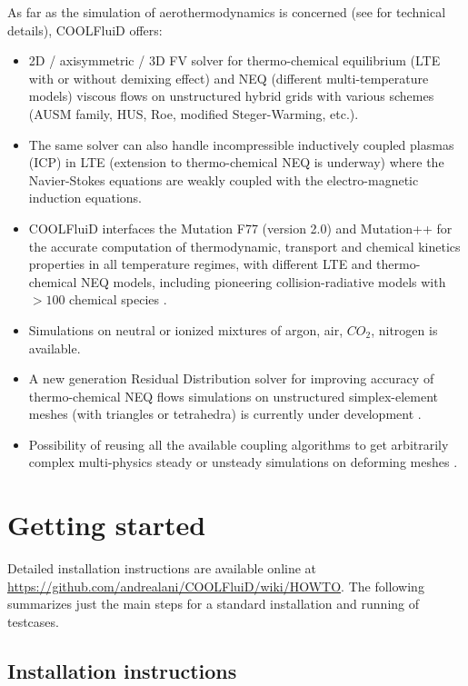 \documentclass[11pt]{article}
\begin{document}
As far as the simulation of aerothermodynamics is concerned 
(see \cite{phd:lani, phd:panesi} for technical details), COOLFluiD offers: 
\begin{itemize}
\item 
  2D / axisymmetric / 3D FV solver for thermo-chemical equilibrium 
  (LTE with or without demixing effect) and NEQ 
  (different multi-temperature models) viscous flows 
  on unstructured hybrid grids with various schemes 
  (AUSM family, HUS, Roe, modified Steger-Warming, etc.).
\item 
  The same solver can also handle incompressible inductively coupled plasmas (ICP) in LTE 
  (extension to thermo-chemical NEQ is underway) where the Navier-Stokes equations 
  are weakly coupled with the electro-magnetic induction equations. 
\item
  COOLFluiD interfaces the Mutation F77 (version 2.0) and Mutation++ for the 
  accurate computation of thermodynamic, transport and chemical kinetics properties 
  in all temperature regimes, with different LTE and thermo-chemical NEQ models, 
  including pioneering collision-radiative models with $> 100$ chemical species \cite{munafo10}.
\item
  Simulations on neutral or ionized mixtures of argon, air, $CO_2$, nitrogen is available. 
\item 
  A new generation Residual Distribution solver for improving accuracy of 
  thermo-chemical NEQ flows simulations on unstructured simplex-element meshes 
  (with triangles or tetrahedra) is currently under development \cite{phd:lani}. 
\item
  Possibility of reusing all the available coupling algorithms to 
  get arbitrarily complex multi-physics steady or unsteady simulations 
  on deforming meshes \cite{phd:wuilbaut}.
\end{itemize}

\section{Getting started}

Detailed installation instructions are available online at \url{https://github.com/andrealani/COOLFluiD/wiki/HOWTO}.
The following summarizes just the main steps for a standard installation and running of testcases.

\subsection{Installation instructions}
\end{document}
